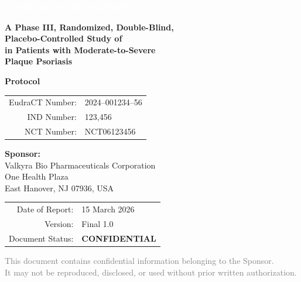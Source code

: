 \documentclass[11pt, a4paper]{article}
\begin{document}
\begin{titlepage}
\thispagestyle{empty}

\begin{tcolorbox}[
  colback=accent,
  colframe=accent,
  width=\textwidth,
  boxrule=0pt,
  sharp corners,
  left=0pt,
  right=0pt,
  top=6mm,
  bottom=6mm,
  before skip=0pt,
  after skip=0pt,
]
  \centering\textcolor{white}{\Large\bfseries CLINICAL STUDY REPORT}
\end{tcolorbox}

\vspace{20mm}

{\centering\LARGE\bfseries\color{secondary} A Phase III, Randomized, Double-Blind,\\[4pt] Placebo-Controlled Study of \studydrug\\[4pt] in Patients with Moderate-to-Severe\\[4pt] Plaque Psoriasis\par}

\vspace{12mm}

{\centering\large\color{accent}\bfseries Protocol \protnum\par}

\vspace{6mm}

{\centering
\begin{tabular}{rl}
EudraCT Number: & 2024--001234--56 \\
IND Number:     & 123,456 \\
NCT Number:     & NCT06123456 \\
\end{tabular}\par}

\vspace{18mm}

\begin{center}
{\large\bfseries\color{secondary} Sponsor:}\\[4pt]
{\large Valkyra Bio Pharmaceuticals Corporation}\\[3pt]
One Health Plaza\\[2pt]
East Hanover, NJ 07936, USA
\end{center}

\vspace{18mm}

{\centering
\begin{tabular}{rl}
Date of Report:  & 15 March 2026 \\
Version:         & Final 1.0 \\
Document Status: & \textbf{CONFIDENTIAL} \\
\end{tabular}\par}

\vfill
{\centering\textcolor{graytext}{\small This document contains confidential information belonging to the Sponsor.\\It may not be reproduced, disclosed, or used without prior written authorization.}\par}
\end{titlepage}
\end{document}

